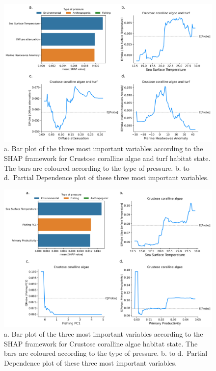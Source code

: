 \begin{figure}
\hypertarget{fig:chap3figS40}{%
\centering
\includegraphics{03-Chapitre3/figures/supplementary/04-pdp_Crustose coralline algae and turf.png}
\caption{a. Bar plot of the three most important variables according to
the SHAP framework for Crustose coralline algae and turf habitat state.
The bars are coloured according to the type of pressure. b. to
d.~Partial Dependence plot of these three most important
variables.}\label{fig:chap3figS40}
}
\end{figure}

\begin{figure}
\hypertarget{fig:chap3figS41}{%
\centering
\includegraphics{03-Chapitre3/figures/supplementary/04-pdp_Crustose coralline algae.png}
\caption{a. Bar plot of the three most important variables according to
the SHAP framework for Crustose coralline algae habitat state. The bars
are coloured according to the type of pressure. b. to d.~Partial
Dependence plot of these three most important
variables.}\label{fig:chap3figS41}
}
\end{figure}

